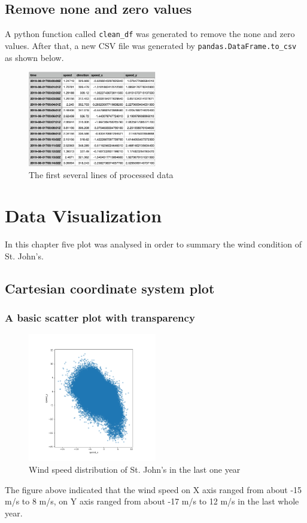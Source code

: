 \documentclass[10pt]{report}
\begin{document}
\section{Remove none and zero values}
A python function called \texttt{clean\_df} was generated to remove the none and zero values. After that, a new CSV file was generated by \texttt{pandas.DataFrame.to\_csv} as shown below.
\begin{figure}[h!]
    \centering
    \includegraphics[width=0.50\textwidth]{images/processed_data.png}
    \caption{The first several lines of processed data}
    \label{fig: PaleBlueDot}    
\end{figure}

 \chapter{Data Visualization}
 In this chapter five plot was analysed in order to summary the wind condition of St. John's.

\section{Cartesian coordinate system plot}

\subsection{A basic scatter plot with transparency}
\begin{figure}[h!]
    \centering
    \includegraphics[width=0.50\textwidth]{images/figure1.png}
    \caption{Wind speed distribution of St. John's in the last one year}
    \label{fig: PaleBlueDot}    
\end{figure}
The figure above indicated that the wind speed on X axis ranged from about -15 m/s to 8 m/s, on Y axis ranged from about -17 m/s to 12 m/s in the last whole year.
\end{document}
